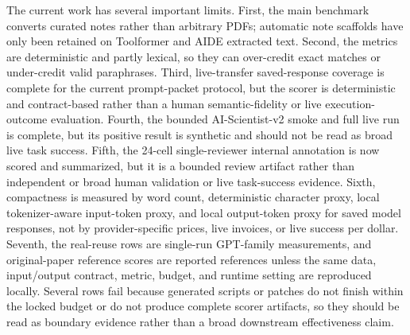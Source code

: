 The current work has several important limits. First, the main benchmark
converts curated notes rather than arbitrary PDFs; automatic note scaffolds have
only been retained on Toolformer and AIDE extracted text. Second, the metrics
are deterministic and partly lexical, so they can over-credit exact matches or
under-credit valid paraphrases. Third, live-transfer saved-response coverage is
complete for the current prompt-packet protocol, but the scorer is
deterministic and contract-based rather than a human semantic-fidelity or live
execution-outcome evaluation. Fourth, the bounded AI-Scientist-v2 smoke and
full live run is complete, but its positive result is synthetic and should not
be read as broad live task success. Fifth, the 24-cell single-reviewer internal
annotation is now scored and summarized, but it is a bounded review artifact
rather than independent or broad human validation or live task-success
evidence. Sixth,
compactness is measured by word count, deterministic character proxy, local
tokenizer-aware input-token proxy, and local output-token proxy for saved model
responses, not by provider-specific prices, live invoices, or live success per
dollar. Seventh, the real-reuse rows are single-run GPT-family measurements,
and original-paper reference scores are reported references unless the same
data, input/output contract, metric, budget, and runtime setting are reproduced
locally. Several rows fail because generated scripts or patches do not finish
within the locked budget or do not produce complete scorer artifacts, so they
should be read as boundary evidence rather than a broad downstream
effectiveness claim.
